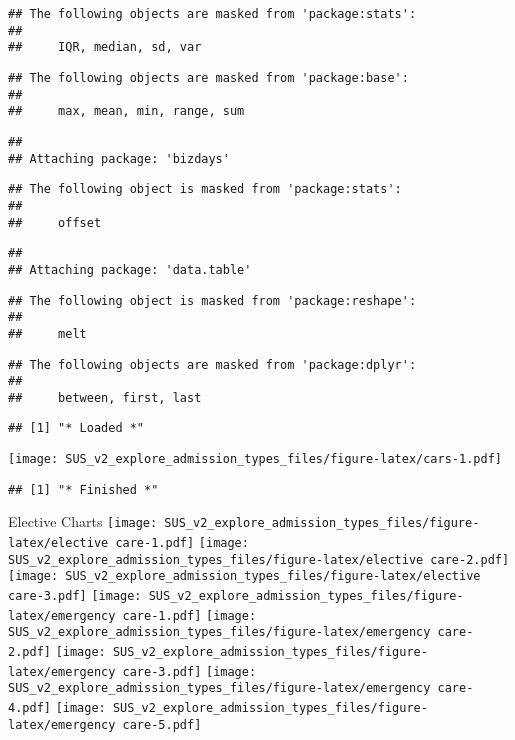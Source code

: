 \documentclass[]{article}
\begin{document}
\begin{verbatim}
## The following objects are masked from 'package:stats':
## 
##     IQR, median, sd, var
\end{verbatim}

\begin{verbatim}
## The following objects are masked from 'package:base':
## 
##     max, mean, min, range, sum
\end{verbatim}

\begin{verbatim}
## 
## Attaching package: 'bizdays'
\end{verbatim}

\begin{verbatim}
## The following object is masked from 'package:stats':
## 
##     offset
\end{verbatim}

\begin{verbatim}
## 
## Attaching package: 'data.table'
\end{verbatim}

\begin{verbatim}
## The following object is masked from 'package:reshape':
## 
##     melt
\end{verbatim}

\begin{verbatim}
## The following objects are masked from 'package:dplyr':
## 
##     between, first, last
\end{verbatim}

\begin{verbatim}
## [1] "* Loaded *"
\end{verbatim}

\texttt{[image: SUS\_v2\_explore\_admission\_types\_files/figure-latex/cars-1.pdf]}

\begin{verbatim}
## [1] "* Finished *"
\end{verbatim}

Elective Charts
\texttt{[image: SUS\_v2\_explore\_admission\_types\_files/figure-latex/elective care-1.pdf]}
\texttt{[image: SUS\_v2\_explore\_admission\_types\_files/figure-latex/elective care-2.pdf]}
\texttt{[image: SUS\_v2\_explore\_admission\_types\_files/figure-latex/elective care-3.pdf]}
\texttt{[image: SUS\_v2\_explore\_admission\_types\_files/figure-latex/emergency care-1.pdf]}
\texttt{[image: SUS\_v2\_explore\_admission\_types\_files/figure-latex/emergency care-2.pdf]}
\texttt{[image: SUS\_v2\_explore\_admission\_types\_files/figure-latex/emergency care-3.pdf]}
\texttt{[image: SUS\_v2\_explore\_admission\_types\_files/figure-latex/emergency care-4.pdf]}
\texttt{[image: SUS\_v2\_explore\_admission\_types\_files/figure-latex/emergency care-5.pdf]}
\end{document}
